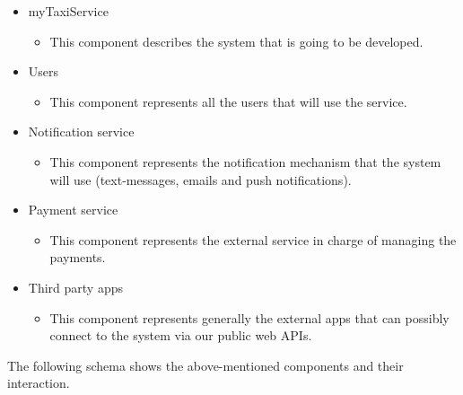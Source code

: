 \documentclass[a4paper,11pt]{report} %
\renewcommand{\labelitemii}{$\circ$}
\begin{document}
	\begin{itemize}
		\renewcommand{\labelitemii}{}
		\item myTaxiService
		\begin{itemize}
			\item This component describes the system that is going to be developed.
		\end{itemize} 
		\item Users
		\begin{itemize}
			\item This component represents all the users that will use the service.
		\end{itemize}
		\item Notification service
		\begin{itemize}
			\item This component represents the notification mechanism that the system will use (text-messages, emails and push notifications).
		\end{itemize}
		\item Payment service
		\begin{itemize}
			\item This component represents the external service in charge of managing the payments.
		\end{itemize}
		\item Third party apps
		\begin{itemize}
			\item This component represents generally the external apps that can possibly connect to the system via our public web APIs.
		\end{itemize}
	\end{itemize}
	\renewcommand{\labelitemii}{$\circ$}
	The following schema shows the above-mentioned components and their interaction.\\
	\begin{minipage}{\linewidth}
		\vspace*{0.35cm}
		\vspace{0.35cm}
	\end{minipage}
	
\end{document}
